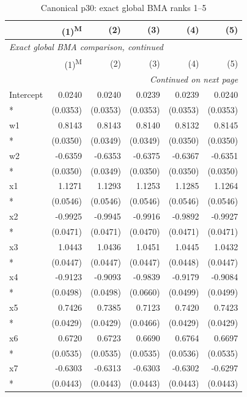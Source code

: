 \begingroup
\scriptsize
\setlength{\tabcolsep}{4pt}
\begin{longtable}{lrrrrr}
\caption{Canonical p30: exact global BMA ranks 1--5}\\
\toprule
 & (1)\textsuperscript{M} & (2) & (3) & (4) & (5) \\
\midrule
\endfirsthead
\multicolumn{6}{l}{\textit{Exact global BMA comparison, continued}} \\
\toprule
 & (1)\textsuperscript{M} & (2) & (3) & (4) & (5) \\
\midrule
\endhead
\midrule\multicolumn{6}{r}{\textit{Continued on next page}}\\\endfoot
\bottomrule\endlastfoot
Intercept & 0.0240 & 0.0240 & 0.0239 & 0.0239 & 0.0240 \\*
 & (0.0353) & (0.0353) & (0.0353) & (0.0353) & (0.0353) \\
w1 & 0.8143 & 0.8143 & 0.8140 & 0.8132 & 0.8145 \\*
 & (0.0350) & (0.0349) & (0.0349) & (0.0350) & (0.0350) \\
w2 & -0.6359 & -0.6353 & -0.6375 & -0.6367 & -0.6351 \\*
 & (0.0350) & (0.0349) & (0.0350) & (0.0350) & (0.0350) \\
x1 & 1.1271 & 1.1293 & 1.1253 & 1.1285 & 1.1264 \\*
 & (0.0546) & (0.0546) & (0.0546) & (0.0546) & (0.0546) \\
x2 & -0.9925 & -0.9945 & -0.9916 & -0.9892 & -0.9927 \\*
 & (0.0471) & (0.0471) & (0.0470) & (0.0471) & (0.0471) \\
x3 & 1.0443 & 1.0436 & 1.0451 & 1.0445 & 1.0432 \\*
 & (0.0447) & (0.0447) & (0.0447) & (0.0448) & (0.0447) \\
x4 & -0.9123 & -0.9093 & -0.9839 & -0.9179 & -0.9084 \\*
 & (0.0498) & (0.0498) & (0.0660) & (0.0499) & (0.0499) \\
x5 & 0.7426 & 0.7385 & 0.7123 & 0.7420 & 0.7423 \\*
 & (0.0429) & (0.0429) & (0.0466) & (0.0429) & (0.0429) \\
x6 & 0.6720 & 0.6723 & 0.6690 & 0.6764 & 0.6697 \\*
 & (0.0535) & (0.0535) & (0.0535) & (0.0536) & (0.0535) \\
x7 & -0.6303 & -0.6313 & -0.6303 & -0.6302 & -0.6297 \\*
 & (0.0443) & (0.0443) & (0.0443) & (0.0443) & (0.0443) \\

\end{longtable}
